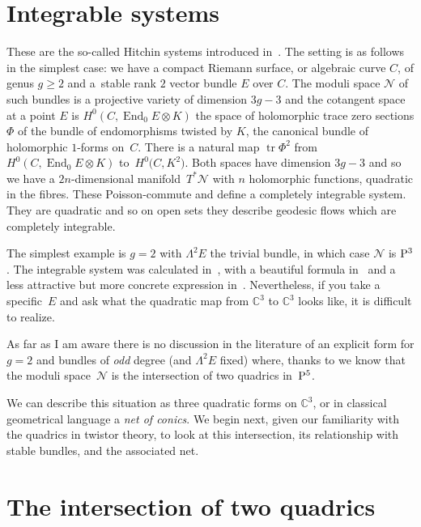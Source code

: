 \documentclass[pdftex]{sigma}
\numberwithin{equation}{section}
\begin{document}
\section{Integrable systems}
These are the so-called Hitchin systems introduced in~\cite{Hitchin1987}. The setting is as follows in the simplest case: we have a compact Riemann surface, or algebraic curve $C$, of genus $g\ge 2$ and a~stable rank $2$ vector bundle $E$ over $C$. The moduli space ${\mathcal N}$ of such bundles is a projective variety of dimension $3g-3$ and the cotangent space at a point $E$ is $H^0(C,\operatorname{End}_0E\otimes K)$ the space of holomorphic trace zero sections $\Phi$ of the bundle of endomorphisms twisted by $K$, the canonical bundle of holomorphic $1$-forms on~$C$. There is a natural map $\operatorname{tr} \Phi^2$ from $H^0(C,\operatorname{End} _0E\otimes K)$ to~$H^0\big(C,K^2\big)$. Both spaces have dimension $3g-3$ and so we have a $2n$-dimensional mani\-fold~$T^*{\mathcal N}$ with $n$ holomorphic functions, quadratic in the fibres. These Poisson-commute and define a completely integrable system. They are quadratic and so on open sets they describe geodesic flows which are completely integrable.

The simplest example is $g=2$ with $\Lambda^2E$ the trivial bundle, in which case ${\mathcal N}$ is ${\rm P}^3$. The integrable system was calculated in~\cite{Geemen/Previato}, with a beautiful formula in~\cite{Gawedzki/Bich} and a less attractive but more concrete expression in~\cite{Loray/Heu}. Nevertheless, if you take a specific~$E$ and ask what the quadratic map from ${\mathbb C}^3$ to ${\mathbb C}^3$ looks like, it is difficult to realize.

As far as I am aware there is no discussion in the literature of an explicit form for $g=2$ and bundles of {\it odd} degree (and $\Lambda^2E$ fixed) where, thanks to \cite{Narasimhan/Ramanan1969,Newstead} we know that the moduli space~${\mathcal N}$ is the intersection of two quadrics in~${\rm P}^5$.

 We can describe this situation as three quadratic forms on ${\mathbb C}^3$, or in classical geometrical language a {\it net of conics}. We begin next, given our familiarity with the quadrics in twistor theory, to look at this intersection, its relationship with stable bundles, and the associated net.

\section{The intersection of two quadrics}
\end{document}
